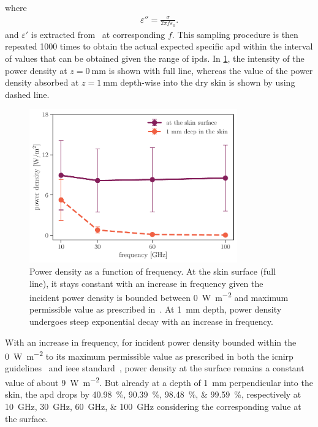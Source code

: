 where
\begin{align}
    \varepsilon'' = \frac{\sigma}{2 \pi f \varepsilon_0}.
\end{align}
and $\varepsilon'$ is extracted from~\cite{Gabriel1996Compilation} at corresponding $f$. 
This sampling procedure is then repeated 1000 times to obtain the actual expected specific \gls{apd} within the interval of values that can be obtained given the range of \gls{ipd}s.
In \cref{fig:pd_decay}, the intensity of the power density at $z=\SI{0}{\mm}$ is shown with full line, whereas the value of the  power density absorbed at $z=\SI{1}{\mm}$ depth-wise into the dry skin is shown by using dashed line.
\begin{figure}[ht]
    \centering
    \includegraphics[width=0.8\textwidth]{artwork/pd_decay.pdf}
    \caption{Power density as a function of frequency. At the skin surface (full line), it stays constant with an increase in frequency given the incident power density is bounded between \SI{0}{\watt\per\m\squared} and maximum permissible value as prescribed in~\cite{ICNIRP2020Guidelines,IEEE2019Standard}. At \SI{1}{\mm} depth, power density undergoes steep exponential decay with an increase in frequency.}
    \label{fig:pd_decay}
\end{figure}
With an increase in frequency, for incident power density bounded within the \SI{0}{\watt\per\m\squared} to its maximum permissible value as prescribed in both the \gls{icnirp} guidelines~\cite{ICNIRP2020Guidelines} and \gls{ieee} standard~\cite{IEEE2019Standard}, power density at the surface remains a constant value of about \SI{9}{\watt\per\m\squared}.
But already at a depth of \SI{1}{\mm} perpendicular into the skin, the \gls{apd} drops by \SIlist[list-units=single]{40.98;90.39;98.48;99.59}{\percent}, respectively at \SIlist[list-units=single]{10;30;60;100}{\GHz} considering the corresponding value at the surface.


